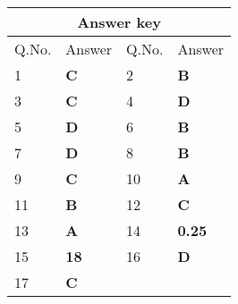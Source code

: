\begin{table}[H]
	\centering
	\begin{tabular}{|p{1.5cm}|p{1.5cm}||p{1.5cm}|p{1.5cm}|}
		\hline
		\multicolumn{4}{|c|}{\textbf{Answer key}}\\\hline\hline
		\rowcolor{ocrel}Q.No.&Answer&Q.No.&Answer\\\hline
		1&\textbf{C} &2&\textbf{B}\\\hline
		3&\textbf{C} &4&\textbf{D} \\\hline
		5&\textbf{D} &6&\textbf{B} \\\hline
		7&\textbf{D}&8&\textbf{B}\\\hline
		9&\textbf{C}&10&\textbf{A}\\\hline
		11&\textbf{B} &12&\textbf{C}\\\hline
		13&\textbf{A}&14&\textbf{0.25}\\\hline
		15&\textbf{18}&16 &\textbf{D}\\\hline
		17&\textbf{C}&\\\hline
		
	\end{tabular}
\end{table}